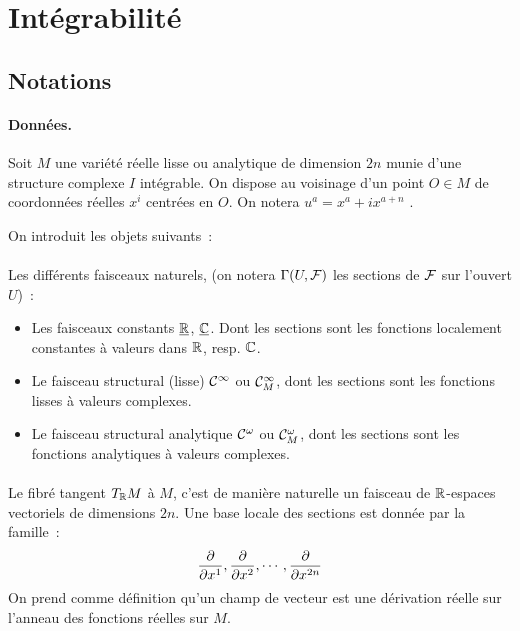\documentclass[12pt,draft]{article}
\begin{document}
\section{Intégrabilité}
\subsection{Notations}
\paragraph*{Données.}
Soit $M$ une variété réelle lisse ou analytique de dimension $2n$ munie d'une structure complexe $I$ intégrable. On dispose au voisinage d'un point $O \in M$ de coordonnées réelles $x^i$ centrées en $O$. On notera $u^a = x^a + ix^{a+n}$	.

On introduit les objets suivants~:
\paragraph{} Les différents faisceaux naturels, (on notera $\Gamma(U,\mathcal{F})$ les sections de $\mathcal{F}$ sur l'ouvert $U$)~:
\begin{itemize}
\item Les faisceaux constants $\underline{\mathbb{R}}$, $\underline{\mathbb{C}}$. Dont les sections sont les fonctions localement constantes à valeurs dans $\mathbb{R}$, resp. $\mathbb{C}$.
\item Le faisceau structural (lisse) $\mathcal{C}^\infty$ ou $\mathcal{C}^\infty_M$, dont les sections sont les fonctions lisses à valeurs complexes.
\item Le faisceau structural analytique $\mathcal{C}^\omega$ ou $\mathcal{C}^\omega_M$, dont les sections sont les fonctions analytiques à valeurs complexes.
\end{itemize}
\paragraph{} Le fibré tangent $T_{\mathbb{R}} M$ à $M$, c'est de manière naturelle un faisceau de $\mathbb{R}$-espaces vectoriels de dimensions $2n$. Une base locale des sections est donnée par la famille~:
\[
\dfrac{\partial{}}{\partial{x^1}} , \dfrac{\partial{}}{\partial{x^2}} , \cdots , \dfrac{\partial{}}{\partial{x^{2n}}}
\]
On prend comme définition qu'un champ de vecteur est une dérivation réelle sur l'anneau des fonctions réelles sur $M$.
\end{document}
